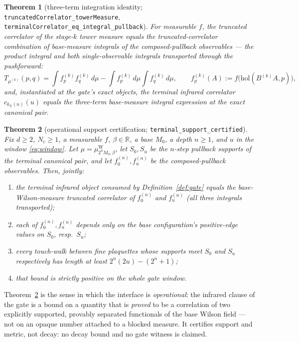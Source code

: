 \documentclass[11pt]{article}
\newtheorem{theorem}{Theorem}[section]
\theoremstyle{definition}
\newcommand{\lean}[1]{\texttt{#1}}
\newcommand{\holo}{\mathrm{hol}}
\newcommand{\muW}{\mu^{\mathrm{W}}}
\newcommand{\kT}{k_{\mathrm{T}}}
\begin{document}
\begin{theorem}[three-term integration identity;
\lean{truncatedCorrelator\_towerMeasure},
\lean{terminalCorrelator\_eq\_integral\_pullback}]\label{thm:integr}
For measurable $f$, the truncated correlator of the stage-$k$ tower
measure equals the truncated-correlator combination of
\emph{base}-measure integrals of the composed-pullback observables ---
the product integral and both single-observable integrals transported
through the pushforward:
\[
T_{\mu^{(k)}}(p, q)
 = \int f_p^{(k)} f_q^{(k)}\, d\mu
 - \int f_p^{(k)}\, d\mu \int f_q^{(k)}\, d\mu,
\qquad f_p^{(k)}(A) := f\bigl(\holo(B^{(k)} A, p)\bigr),
\]
and, instantiated at the gate's exact objects, the terminal infrared
correlator $c_{\kT(n)}(u)$ equals the three-term base-measure integral
expression at the exact canonical pair.
\end{theorem}

\begin{theorem}[operational support certification;
\lean{terminal\_support\_certified}]\label{thm:capstone}
Fix $d \ge 2$, $N_c \ge 1$, a measurable $f$, $\beta \in \mathbb{R}$,
a base $M_0$, a depth $n \ge 1$, and $u$ in the window
\eqref{eq:window}.  Let $\mu = \muW_{2^n M_0, \beta}$, let
$S_0, S_u$ be the $n$-step pullback supports of the terminal canonical
pair, and let $f^{(n)}_0, f^{(n)}_u$ be the composed-pullback
observables.  Then, jointly:
\begin{enumerate}
\item[(1)] the terminal infrared object consumed by
Definition~\ref{def:gate} equals the base-Wilson-measure truncated
correlator of $f^{(n)}_0$ and $f^{(n)}_u$ (all three integrals
transported);
\item[(2, 3)] each of $f^{(n)}_0, f^{(n)}_u$ depends only on the base
configuration's positive-edge values on $S_0$, resp.\ $S_u$;
\item[(4)] every touch-walk between fine plaquettes whose supports
meet $S_0$ and $S_u$ respectively has length at least
$2^n(2u) - (2^n + 1)$;
\item[(5)] that bound is strictly positive on the whole gate window.
\end{enumerate}
\end{theorem}

Theorem~\ref{thm:capstone} is the sense in which the interface is
\emph{operational}: the infrared clause of the gate is a bound on a
quantity that is \emph{proved} to be a correlation of two explicitly
supported, provably separated functionals of the base Wilson field ---
not on an opaque number attached to a blocked measure.  It certifies
support and metric, not decay: no decay bound and no gate witness is
claimed.
\end{document}
